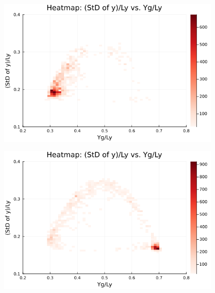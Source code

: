 \begin{figure}[H]
  \centering
  \includegraphics[scale=0.6]{image/RaRtmap_heat/2023-11-15T08:24:37.362__chi1.265_Ay50_rho0.4_T0.43_dT0.04_Rd0.0_Rt0.375_Ra0.4693845_g0.0003999718779659611_run4.0e7_output.png}
  \label{}
\end{figure}

\begin{figure}[H]
  \centering
  \includegraphics[scale=0.6]{image/RaRtmap_heat/2023-11-15T09:16:40.082__chi1.265_Ay50_rho0.4_T0.43_dT0.04_Rd0.0_Rt0.375_Ra0.938769_g0.0003999718779659611_run4.0e7_output.png}
  \label{}
\end{figure}

